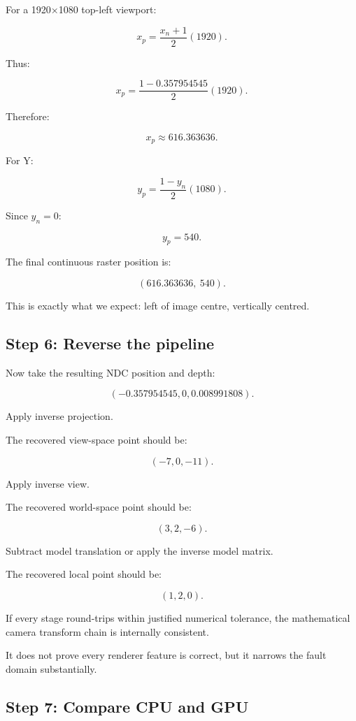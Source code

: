 \hypertarget{02-foundations-ii-ch037-step-5-viewport-mapping}{}

For a 1920×1080 top-left viewport:

\[ x_p=\frac{x_n+1}{2}(1920). \]

Thus:

\[ x_p= \frac{1-0.357954545}{2}(1920). \]

Therefore:

\[ \boxed{x_p\approx616.363636}. \]

For Y:

\[ y_p=\frac{1-y_n}{2}(1080). \]

Since \(y_n=0\):

\[ \boxed{y_p=540}. \]

The final continuous raster position is:

\[ \boxed{ (616.363636,\ 540). } \]

This is exactly what we expect: left of image centre, vertically centred.

\subsection{Step 6: Reverse the pipeline}\label{02-foundations-ii-ch037-step-6-reverse-the-pipeline}

\hypertarget{02-foundations-ii-ch037-step-6-reverse-the-pipeline}{}

Now take the resulting NDC position and depth:

\[ (-0.357954545,0,0.008991808). \]

Apply inverse projection.

The recovered view-space point should be:

\[ \boxed{(-7,0,-11)}. \]

Apply inverse view.

The recovered world-space point should be:

\[ \boxed{(3,2,-6)}. \]

Subtract model translation or apply the inverse model matrix.

The recovered local point should be:

\[ \boxed{(1,2,0)}. \]

If every stage round-trips within justified numerical tolerance, the mathematical camera transform chain is internally consistent.

It does not prove every renderer feature is correct, but it narrows the fault domain substantially.

\subsection{Step 7: Compare CPU and GPU}\label{02-foundations-ii-ch037-step-7-compare-cpu-and-gpu}

